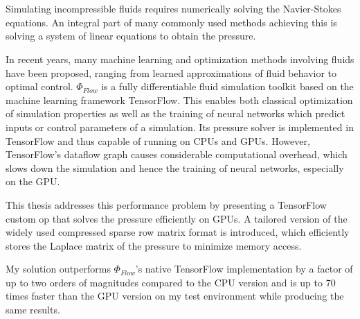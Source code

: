 \chapter{\abstractname}
Simulating incompressible fluids requires numerically solving the Navier-Stokes equations. An integral part of many commonly used methods achieving this is solving a system of linear equations to obtain the pressure. 
\par In recent years, many machine learning and optimization methods involving fluids have been proposed, ranging from learned approximations of fluid behavior to optimal control. $\Phi_{Flow}$  is a fully differentiable fluid simulation toolkit based on the machine learning framework TensorFlow. This enables both classical optimization of simulation properties as well as the training of neural networks which predict inputs or control parameters of a simulation. Its pressure solver is implemented in TensorFlow and thus capable of running on CPUs and GPUs. However, TensorFlow's dataflow graph causes considerable computational overhead, which slows down the simulation and hence the training of neural networks, especially on the GPU. 
\par This thesis addresses this performance problem by presenting a TensorFlow custom op that solves the pressure efficiently on GPUs. A tailored version of the widely used compressed sparse row matrix format is introduced, which efficiently stores the Laplace matrix of the pressure to minimize memory access. 
\par My solution outperforms $\Phi_{Flow}$'s native TensorFlow implementation by a factor of up to two orders of magnitudes compared to the CPU version and is up to 70 times faster than the GPU version on my test environment while producing the same results.